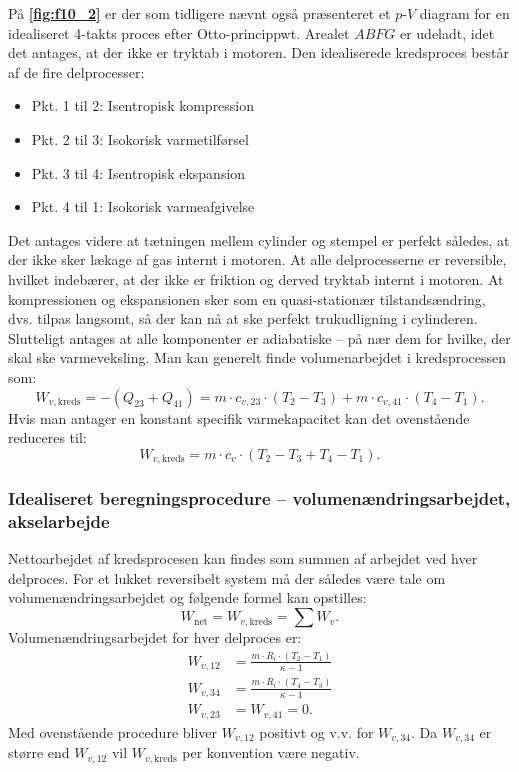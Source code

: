 På \textbf{\autoref{fig:f10_2}} er der som tidligere nævnt også præsenteret et $p$-$V$ diagram for en idealiseret 4-takts proces efter Otto-princippwt. Arealet $ABFG$ er udeladt, idet det antages, at der ikke er tryktab i motoren. Den idealiserede kredsproces består af de fire delprocesser:
\begin{itemize}
  \item Pkt. 1 til 2: Isentropisk kompression
  \item Pkt. 2 til 3: Isokorisk varmetilførsel
  \item Pkt. 3 til 4: Isentropisk ekspansion
  \item Pkt. 4 til 1: Isokorisk varmeafgivelse
\end{itemize}
Det antages videre at tætningen mellem cylinder og stempel er perfekt således, at der ikke sker lækage af gas internt i motoren. At alle delprocesserne er reversible, hvilket indebærer, at der ikke er friktion og derved tryktab internt i motoren. At kompressionen og ekspansionen sker som en quasi-stationær tilstandsændring, dvs. tilpas langsomt, så der kan nå at ske perfekt trukudligning i cylinderen. Slutteligt antages at alle komponenter er adiabatiske -- på nær dem for hvilke, der skal ske varmeveksling. Man kan generelt finde volumenarbejdet i kredsprocessen som:
\[ 
W_{v, \mathrm{kreds}} = - \left( Q_{23} + Q_{41} \right) = m \cdot c_{v, 23} \cdot \left( T_2 - T_3 \right) + m \cdot c_{v, 41} \cdot \left( T_4 - T_1 \right) 
.\]
Hvis man antager en konstant specifik varmekapacitet kan det ovenstående reduceres til:
\[ 
W_{v, \mathrm{kreds}} = m \cdot c_{v} \cdot \left( T_2 - T_3 + T_4 - T_1 \right) 
.\]

\subsubsection{Idealiseret beregningsprocedure -- volumenændringsarbejdet, akselarbejde}
Nettoarbejdet af kredsprocesen kan findes som summen af arbejdet ved hver delproces. For et lukket reversibelt system må der således være tale om volumenændringsarbejdet og følgende formel kan opstilles:
\[ 
W_{\mathrm{net}} = W_{v, \mathrm{kreds}} = \sum W_{v}
.\]
Volumenændringsarbejdet for hver delproces er:
\begin{align*}
  W_{v, 12} &= \frac{m \cdot R_i \cdot \left( T_2 - T_1 \right) }{\kappa - 1}\\
  W_{v, 34} &= \frac{m \cdot R_i \cdot \left( T_4 - T_3 \right) }{\kappa - 1} \\
  W_{v, 23} &= W_{v, 41} = 0
.\end{align*}
Med ovenstående procedure bliver $W_{v, 12}$ positivt og v.v. for $W_{v, 34}$. Da $W_{v, 34}$ er større end $W_{v, 12}$ vil $W_{v, \mathrm{kreds}}$ per konvention være negativ.

